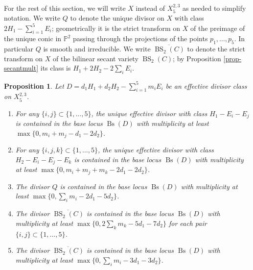 \documentclass[a4paper,11pt]{article}
\newtheorem{proposition}[theorem]{Proposition}
\newcommand{\PP}{\mathbb P}
\newcommand{\Bs}{\operatorname{Bs}}
\newcommand{\BS}{\operatorname{BS}}
\begin{document}
For the rest of this section, we will write $X$ instead of $X^{2,3}_5$ as needed to simplify notation. We write $Q$ to denote the unique divisor on $X$ with class $2H_1-\sum_{i=1}^5 E_i$; geometrically it is the strict transform on $X$ of the preimage of the unique conic in $\PP^2$ passing through the projections of the points $p_1,\ldots,p_5$. In particular $Q$ is smooth and irreducible. We write $\overline{\BS_2(C)}$ to denote the strict transform on $X$ of the bilinear secant variety $\BS_2(C)$; by Proposition \ref{prop-secantmult} its class is $H_1+2H_2-2\sum_i E_i$.
\begin{proposition} \label{prop-bli-x235}
Let $D=d_1H_1+d_2H_2-\sum_{i=1}^5 m_i E_i$ be an effective divisor class on $X^{2,3}_5$. 
\begin{enumerate}
    \item[(a)] For any $\{i,j\} \subset \{1,\ldots,5\}$, the unique effective divisor with class $H_1-E_i-E_j$ is contained in the base locus $\Bs(D)$ with multiplicity at least $\max \{0,m_i+m_j-d_1-2d_2\}$.
    \item[(b)] For any $\{i,j,k\} \subset \{1,\ldots,5\}$, the unique effective divisor with class $H_2-E_i-E_j-E_k$ is contained in the base locus $\Bs(D)$ with multiplicity at least $\max \{0,m_i+m_j+m_k-2d_1-2d_2\}$.
    \item[(c)] The divisor $Q$ is contained in the base locus $\Bs(D)$ with multiplicity at least $\max\{0,\sum_i m_i - 2d_1-5d_2\}$.
    \item[(d)] The divisor $\overline{\BS_2(C)}$ is contained in the base locus $\Bs(D)$ with multiplicity at least $\max\{0,2\sum_k m_k - 5d_1-7d_2\}$ for each pair $\{i,j\} \subset \{1,\ldots,5\}$.
    \item[(e)] The divisor $\overline{\BS_2(C)}$ is contained in the base locus $\Bs(D)$ with multiplicity at least $\max\{0,\sum_i m_i -3d_1-3d_2\}$.
   
\end{enumerate}
\end{proposition}
\end{document}

